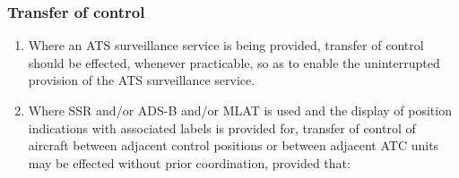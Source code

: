 \begin{enumerate}
\begin{enumerate}

    \end{enumerate}
\end{enumerate}

\subsubsection{Transfer of control}

\begin{enumerate}
    \item Where an ATS surveillance service is being provided, transfer of control should be effected, whenever practicable, so as to enable the uninterrupted provision of the ATS surveillance service.
    \item Where SSR and/or ADS-B and/or MLAT is used and the display of position indications with associated labels is provided for, transfer of control of aircraft between adjacent control positions or between adjacent ATC units may be effected without prior coordination, provided that:
    

\end{enumerate}
